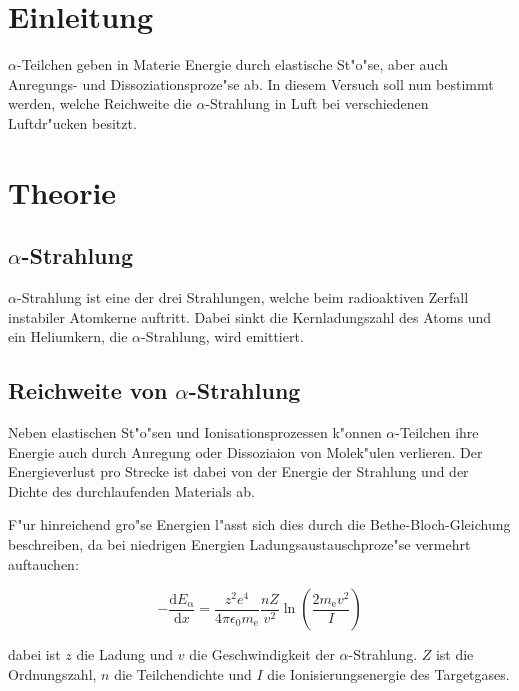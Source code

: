 \section{Einleitung} %
\label{sec:einleitung}

	
	$\alpha$-Teilchen geben in Materie Energie durch elastische St"o"se, aber auch Anregungs- und Dissoziationsproze"se ab. In diesem Versuch soll nun bestimmt werden, welche Reichweite die $\alpha$-Strahlung in Luft bei verschiedenen Luftdr"ucken besitzt.
	
\section{Theorie} %
\label{sec:theorie}

\subsection{$\alpha$-Strahlung} %
\label{sub:_alpha_strahlung}

$\alpha$-Strahlung ist eine der drei Strahlungen, welche beim radioaktiven Zerfall instabiler Atomkerne auftritt.
Dabei sinkt die Kernladungszahl des Atoms und ein Heliumkern, die $\alpha$-Strahlung, wird emittiert.

\subsection{Reichweite von $\alpha$-Strahlung} %
\label{sub:reichweite_von_alpha_strahlung}

Neben elastischen St"o"sen und Ionisationsprozessen k"onnen $\alpha$-Teilchen ihre Energie auch durch Anregung oder Dissoziaion von Molek"ulen verlieren. Der Energieverlust pro Strecke ist dabei von der Energie der Strahlung und der Dichte des durchlaufenden Materials ab.

F"ur hinreichend gro"se Energien l"asst sich dies durch die Bethe-Bloch-Gleichung beschreiben, da bei niedrigen Energien Ladungsaustauschproze"se vermehrt auftauchen:

\begin{equation}
	-\frac{\mathrm{d}E_\mathrm{\alpha}}{\mathrm{d}x} = \frac{z^2e^4}{4\pi \epsilon_\mathrm{0} m_\mathrm{e}} \frac{n Z}{v^2} \ln \left( \frac{2 m_\mathrm{e}v^2}{I} \right)
\end{equation}

dabei ist $z$ die Ladung und $v$ die Geschwindigkeit der $\alpha$-Strahlung. $Z$ ist die Ordnungszahl, $n$ die Teilchendichte und $I$ die Ionisierungsenergie des Targetgases.

